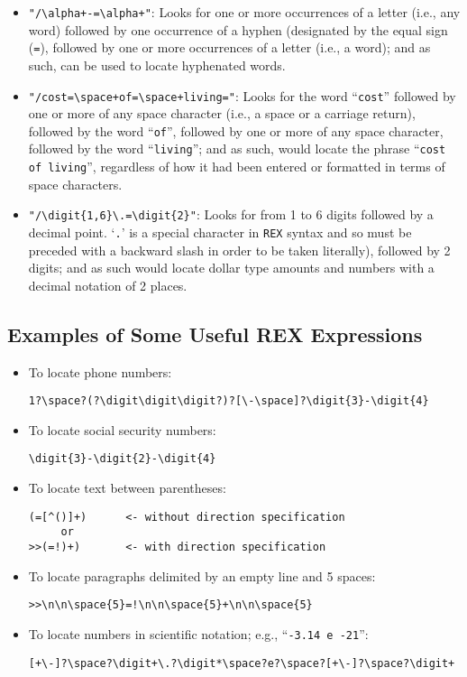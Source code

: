 \begin{itemize}
\item \verb`"/\alpha+-=\alpha+"`:  Looks for one or more occurrences of a
    letter (i.e., any word) followed by one occurrence of a hyphen (designated
    by the equal sign (\verb`=`), followed by one or more occurrences of a letter
    (i.e., a word); and as such, can be used to locate hyphenated words.

\item \verb`"/cost=\space+of=\space+living="`:  Looks for the word ``\verb`cost`''
    followed by one or more of any space character (i.e., a space or a carriage
    return), followed by the word ``\verb`of`'', followed by one or more of any space
    character, followed by the word ``\verb`living`''; and as such, would locate the
    phrase ``\verb`cost of living`'', regardless of how it had been entered or formatted
    in terms of space characters.

\item \verb`"/\digit{1,6}\.=\digit{2}"`:  Looks for from 1 to 6 digits followed
    by a decimal point.  `\verb`.`' is a special character in \verb`REX` syntax and
    so must be preceded with a backward slash in order to be taken literally), followed
    by 2 digits; and as such would locate dollar type amounts and numbers with
    a decimal notation of 2 places.
\end{itemize}

\subsection{Examples of Some Useful REX Expressions}

\begin{itemize}
\item To locate phone numbers:
\begin{verbatim}
1?\space?(?\digit\digit\digit?)?[\-\space]?\digit{3}-\digit{4}
\end{verbatim}

\item To locate social security numbers:
\begin{verbatim}
\digit{3}-\digit{2}-\digit{4}
\end{verbatim}

\item To locate text between parentheses:
\begin{verbatim}
(=[^()]+)      <- without direction specification
     or
>>(=!)+)       <- with direction specification
\end{verbatim}

\item To locate paragraphs delimited by an empty line and 5 spaces:
\begin{verbatim}
>>\n\n\space{5}=!\n\n\space{5}+\n\n\space{5}
\end{verbatim}

\item To locate numbers in scientific notation; e.g., ``\verb`-3.14 e -21`'':
\begin{verbatim}
[+\-]?\space?\digit+\.?\digit*\space?e?\space?[+\-]?\space?\digit+
\end{verbatim}
\end{itemize}

